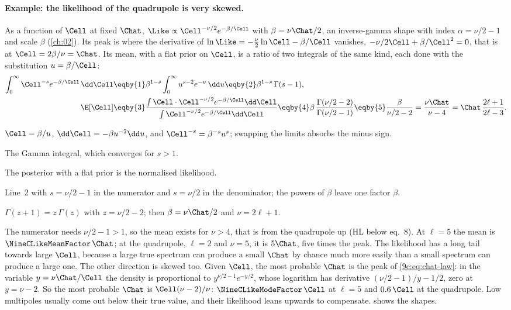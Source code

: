 \paragraph{Example: the likelihood of the quadrupole is very skewed.} As a function of $\Cell$ at fixed
$\Chat$, $\Like\propto\Cell^{-\nu/2}e^{-\beta/\Cell}$ with $\beta=\nu\Chat/2$, an inverse-gamma shape with index
$\alpha=\nu/2-1$ and scale $\beta$ (\cref{ch:02}). Its peak is where the derivative of
$\ln\Like=-\tfrac\nu2\ln\Cell-\beta/\Cell$ vanishes, $-\nu/2\Cell+\beta/\Cell^2=0$, that is at
$\Cell=2\beta/\nu=\Chat$. Its mean, with a flat prior on $\Cell$, is a ratio of two integrals of the same kind,
each done with the substitution $u=\beta/\Cell$:
\begin{align}
  \int_0^\infty\Cell^{-s}e^{-\beta/\Cell}\,\dd\Cell
  &\eqby{1}\beta^{1-s}\int_0^\infty u^{s-2}e^{-u}\,\dd u
   \eqby{2}\beta^{1-s}\,\Gamma(s-1),
  \nonumber\\
  \E[\Cell]
  &\eqby{3}\frac{\int\Cell\cdot\Cell^{-\nu/2}e^{-\beta/\Cell}\dd\Cell}{\int\Cell^{-\nu/2}e^{-\beta/\Cell}\dd\Cell}
   \eqby{4}\beta\,\frac{\Gamma(\nu/2-2)}{\Gamma(\nu/2-1)}
   \eqby{5}\frac{\beta}{\nu/2-2}=\frac{\nu\Chat}{\nu-4}=\Chat\,\frac{2\ell+1}{2\ell-3}.
  \label{9c:eq:invgamma-mean}
\end{align}
\begin{explain}
  \item $\Cell=\beta/u$, $\dd\Cell=-\beta u^{-2}\dd u$, and $\Cell^{-s}=\beta^{-s}u^{s}$; swapping the limits
        absorbs the minus sign.
  \item The Gamma integral, which converges for $s>1$.
  \item The posterior with a flat prior is the normalised likelihood.
  \item Line~2 with $s=\nu/2-1$ in the numerator and $s=\nu/2$ in the denominator; the powers of $\beta$
        leave one factor $\beta$.
  \item $\Gamma(z+1)=z\,\Gamma(z)$ with $z=\nu/2-2$; then $\beta=\nu\Chat/2$ and $\nu=2\ell+1$.
\end{explain}
The numerator needs $\nu/2-1>1$, so the mean exists for $\nu>4$, that is from the quadrupole up (HL below
eq.~8). At $\ell=5$ the mean is $\NineCLikeMeanFactor\,\Chat$; at the quadrupole, $\ell=2$ and $\nu=5$, it is
$5\Chat$, five times the peak. The likelihood has a long tail towards large $\Cell$, because a large true
spectrum can produce a small $\Chat$ by chance much more easily than a small spectrum can produce a large
one. The other direction is skewed too. Given $\Cell$, the most probable $\Chat$ is the peak of
\eqref{9c:eq:chat-law}: in the variable $y=\nu\Chat/\Cell$ the density is proportional to
$y^{\nu/2-1}e^{-y/2}$, whose logarithm has derivative $(\nu/2-1)/y-1/2$, zero at $y=\nu-2$. So the most
probable $\Chat$ is $\Cell(\nu-2)/\nu$: $\NineCLikeModeFactor\,\Cell$ at $\ell=5$ and $0.6\,\Cell$ at the
quadrupole. Low multipoles usually come out below their true value, and their likelihood leans upwards to
compensate.  shows the shapes.

